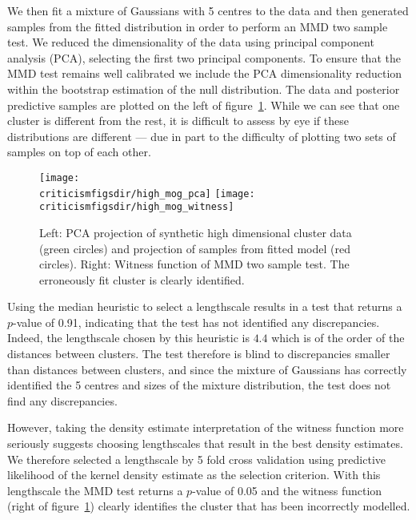 We then fit a mixture of Gaussians \citep[e.g.][]{McLachlan2004-qz} with 5 centres to the data and then generated samples from the fitted distribution in order to perform an MMD two sample test.
We reduced the dimensionality of the data using principal component analysis (PCA), selecting the first two principal components.
To ensure that the MMD test remains well calibrated we include the PCA dimensionality reduction within the bootstrap estimation of the null distribution.
The data and posterior predictive samples are plotted on the left of figure~\ref{fig:high_mog}.
While we can see that one cluster is different from the rest, it is difficult to assess by eye if these distributions are different --- due in part to the difficulty of plotting two sets of samples on top of each other.

\begin{figure}[ht]
\centering
\texttt{[image: \\criticismfigsdir/high\_mog\_pca]}
\hspace{0.1\columnwidth}
\texttt{[image: \\criticismfigsdir/high\_mog\_witness]}
\caption{
Left: PCA projection of synthetic high dimensional cluster data (green circles) and projection of samples from fitted model (red circles).
Right: Witness function of MMD two sample test. The erroneously fit cluster is clearly identified.
}
\label{fig:high_mog}
\end{figure}

Using the median heuristic to select a lengthscale results in a test that returns a $p$-value of 0.91, indicating that the test has not identified any discrepancies.
Indeed, the lengthscale chosen by this heuristic is $4.4$ which is of the order of the distances between clusters.
The test therefore is blind to discrepancies smaller than distances between clusters\footnotemark, and since the mixture of Gaussians has correctly identified the 5 centres and sizes of the mixture distribution, the test does not find any discrepancies.

However, taking the density estimate interpretation of the witness function more seriously suggests choosing lengthscales that result in the best density estimates.
We therefore selected a lengthscale by 5 fold cross validation using predictive likelihood of the kernel density estimate as the selection criterion.
With this lengthscale the MMD test returns a $p$-value of 0.05 and the witness function (right of figure~\ref{fig:high_mog}) clearly identifies the cluster that has been incorrectly modelled.

